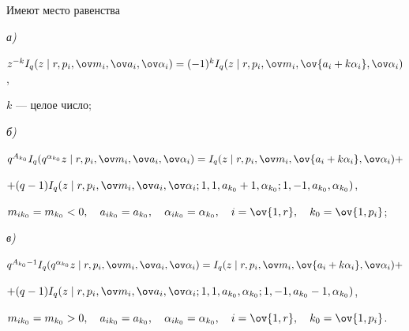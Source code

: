 \begin{thm} 


Имеют место равенства


 


{\em а)} 


$z^{-k}I_q( z\mid 


r, p_i,\ov m_i,\ov a_i,\ov\alpha_i)=(-1)^k I_q(z\mid 


r, p_i,\ov m_i,\ov{a_i+k\alpha_i},\ov\alpha_i)$, 


$k$ --- целое число$;$ 


\smallskip


 


{\em б)} 


$


q^{A_{k_0}}I_q(q^{\alpha_{k_0}}z\mid 


r, p_i,\ov m_i,\ov a_i,\ov\alpha_i)=I_q(z\mid 


r, p_i,\ov m_i,\ov{ a_i+k\alpha_i},\ov\alpha_i) +$ 





\begin{center} 


$+(q-1)I_q(z\mid r, p_i,\ov m_i,\ov a_i,\ov\alpha_i; 1,1, 


a_{k_0}+1,\alpha_{k_0}; 1,-1,a_{k_0},\alpha_{k_0})$, 


 


$m_{i k_0}=m_{k_0}<0,\quad a_{i k_0}=a_{k_0},\quad 


\alpha_{i k_0}=\alpha_{k_0},\quad 


i=\ov{1,r},\quad k_0=\ov{1,p_i}$; 


\end{center}


 


{\em в)} 


$q^{A_{k_0}-1}I_q(q^{\alpha_{k_0}}z\mid 


r, p_i,\ov m_i,\ov a_i,\ov\alpha_i)=I_q(z\mid 


r, p_i,\ov m_i,\ov{a_i+k\alpha_i},\ov\alpha_i)+$ 





\begin{center} 


$+(q-1)I_q(z\mid r, p_i,\ov m_i,\ov a_i,\ov\alpha_i; 


1,1, a_{k_0},\alpha_{k_0};1, -1,a_{k_0}-1,\alpha_{k_0})$, 


 


$m_{i k_0}=m_{k_0}>0,\quad a_{i k_0}=a_{k_0},\quad 


\alpha_{i k_0}=\alpha_{k_0},\quad 


i=\ov{1,r},\quad k_0=\ov{1,p_i}$.


\end{center} 


\end{thm} 



